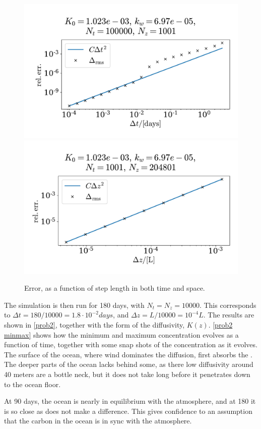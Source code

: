 \documentclass{article}
\begin{document}
    \begin{figure}
        \centering
        \includegraphics[width=.49\textwidth]{../plots/prob2_conv_test_t}
        \includegraphics[width=.49\textwidth]{../plots/prob2_conv_test_z}
        \caption{Error, as a function of step length in both time and space.}
        \label{prob2 conv}
    \end{figure}

    The simulation is then run for 180 days, with $N_t = N_z = 10000$. This corresponds to $\Delta t = 180 / 10000 = 1.8 \cdot 10^{-2} \si{days}$, and $\Delta z = L/10000 = 10^{-4} L$. The results are shown in \autoref{prob2}, together with the form of the diffusivity, $K(z)$. \autoref{prob2 minmax} shows how the minimum and maximum concentration evolves as a function of time, together with some snap shots of the concentration as it evolves. The surface of the ocean, where wind dominates the diffusion, first absorbs the . The deeper parts of the ocean lacks behind some, as there low diffusivity around 40 meters are a bottle neck, but it does not take long before it penetrates down to the ocean floor.

    At 90 days, the ocean is nearly in equilibrium with the atmosphere, and at 180 it is so close as does not make a difference. This gives confidence to an assumption that the carbon in the ocean is in sync with the atmosphere.
\end{document}

